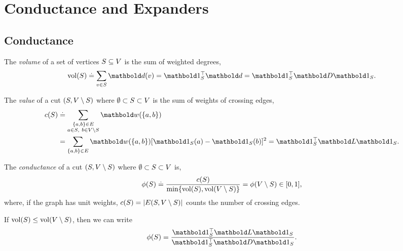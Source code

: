 
\chapter{Conductance and Expanders}

\section{Conductance}

\begin{defn}[Volume] The \emph{volume} of a set of vertices $S \subseteq V$ is the sum of weighted degrees, \begin{align}
    \vol(S) \defeq \sum_{v \in \sS} \vd(v) = \trans{\vOne_\sS}\vd = \trans{\vOne_\sS}\mD\vOne_\sS.
\end{align}
\end{defn}

\begin{defn} The \emph{value} of a cut $(S, V \setminus S)$ where $\emptyset \subset S \subset V$ is the sum of weights of crossing edges, \begin{align}\begin{split}
    c(\sS) &\defeq \sum_{\substack{\{a,b\} \in \sE \\ a \in \sS,\ b \in \sV \setminus \sS}} \vw(\{a,b\}) \\
    &= \sum_{\{a,b\}\in\sE} \vw(\{a,b\}) [\vOne_\sS(a) - \vOne_\sS(b)]^2 = \trans{\vOne_\sS}\mL\vOne_\sS.
\end{split}\end{align}
\end{defn}

\begin{defn} The \emph{conductance} of a cut $(S, V \setminus S)$ where $\emptyset \subset S \subset V$ is, \begin{align}
    \phi(S) \overset{.}{=} \frac{c(S)}{\min\{\mathrm{vol}(S), \mathrm{vol}(V \setminus S)\}} = \phi(V \setminus S) \in [0,1],
\end{align} where, if the graph has unit weights, $c(S) = |E(S, V \setminus S)|$ counts the number of crossing edges.
\end{defn}

\begin{rmk}
If $\mathrm{vol}(S) \leq \mathrm{vol}(V \setminus S)$, then we can write \begin{align}
    \phi(\sS) = \frac{\trans{\vOne_\sS}\mL\vOne_\sS}{\trans{\vOne_\sS}\mD\vOne_\sS}.
\end{align}
\end{rmk}

